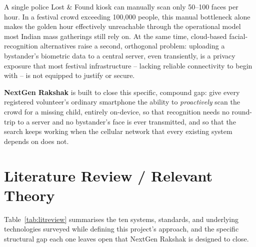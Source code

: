 \documentclass[12pt,a4paper,oneside]{report}
\begin{document}
A single police Lost \& Found kiosk can manually scan only 50--100 faces per
hour. In a festival crowd exceeding 100,000 people, this manual bottleneck
alone makes the golden hour effectively unreachable through the operational
model most Indian mass gatherings still rely on. At the same time,
cloud-based facial-recognition alternatives raise a second, orthogonal
problem: uploading a bystander's biometric data to a central server, even
transiently, is a privacy exposure that most festival infrastructure --
lacking reliable connectivity to begin with -- is not equipped to justify or
secure.

\textbf{NextGen Rakshak} is built to close this specific, compound gap: give
every registered volunteer's ordinary smartphone the ability to
\emph{proactively} scan the crowd for a missing child, entirely on-device, so
that recognition needs no round-trip to a server and no bystander's face is
ever transmitted, and so that the search keeps working when the cellular
network that every existing system depends on does not.

\section{Literature Review / Relevant Theory}

Table~\ref{tab:litreview} summarises the ten systems, standards, and
underlying technologies surveyed while defining this project's approach, and
the specific structural gap each one leaves open that NextGen Rakshak is
designed to close.
\end{document}
